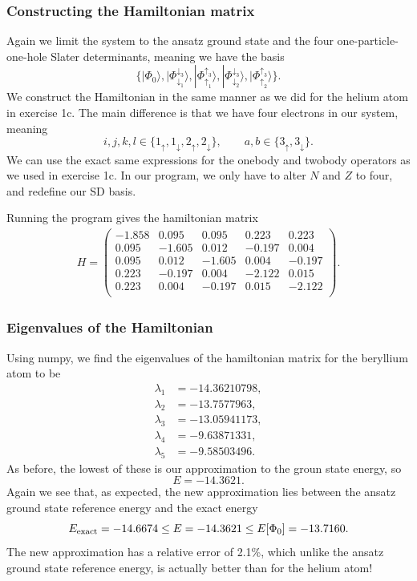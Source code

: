 \documentclass[a4paper, 11pt, notitlepage, english]{article}
\newcommand{\ket}[1]{|#1 \rangle}
\renewcommand{\d}{{\rm d}}
\renewcommand{\u}{\uparrow}
\renewcommand{\d}{\downarrow}
\newcommand{\ui}{{\u_1}}
\newcommand{\uii}{{\u_2}}
\newcommand{\uiii}{{\u_3}}
\newcommand{\di}{{\d_1}}
\newcommand{\dii}{{\d_2}}
\newcommand{\diii}{{\d_3}}
\begin{document}
\subsubsection*{Constructing the Hamiltonian matrix}
Again we limit the system to the ansatz ground state and the four one-particle-one-hole Slater determinants, meaning we have the basis
$$ \{ \ket{\Phi_0}, \ket{\Phi_\di^\diii}, \ket{\Phi_\ui^\uiii}, \ket{\Phi_\dii^\diii}, \ket{\Phi_\uii^\uiii} \}.$$
We construct the Hamiltonian in the same manner as we did for the helium atom in exercise 1c. The main difference is that we have four electrons in our system, meaning
$$i,j,k,l \in \{1_\u, 1_\d, 2_\u, 2_\d\}, \qquad a,b \in \{3_\u, 3_\d\}.$$
We can use the exact same expressions for the onebody and twobody operators as we used in exercise 1c. In our program, we only have to alter $N$ and $Z$ to four, and redefine our SD basis.

Running the program gives the hamiltonian matrix
\begin{align*}
H = \begin{pmatrix}
-1.858 &  0.095 &  0.095 &  0.223 &  0.223   \\
0.095 &  -1.605 &  0.012 &  -0.197 &  0.004   \\
0.095 &  0.012 &  -1.605 &  0.004 &  -0.197   \\
0.223 &  -0.197 &  0.004 &  -2.122 &  0.015   \\
0.223 &  0.004 &  -0.197 &  0.015 &  -2.122   \\	
\end{pmatrix}.
\end{align*}

\subsubsection*{Eigenvalues of the Hamiltonian}
Using numpy, we find the eigenvalues of the hamiltonian matrix for the beryllium atom to be
\begin{align*}
\lambda_1 &= -14.36210798, \\
\lambda_2 &= -13.7577963, \\
\lambda_3 &= -13.05941173, \\
\lambda_4 &= -9.63871331, \\
\lambda_5 &= -9.58503496. 
\end{align*}
As before, the lowest of these is our approximation to the groun state energy, so
$$E = -14.3621.$$
Again we see that, as expected, the new approximation lies between the ansatz ground state reference energy and the exact energy
$$E_{\rm exact} = -14.6674 \leq E = -14.3621 \leq E[\Phi_0] = -13.7160.$$ 
The new approximation has a relative error of 2.1\%, which unlike the ansatz ground state reference energy, is actually better than for the helium atom!
\end{document}
